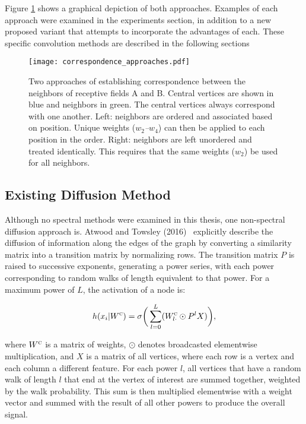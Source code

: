 Figure \ref{fig:correspondence_approaches} shows a graphical depiction of both approaches.
Examples of each approach were examined in the experiments section, in addition to a new proposed variant that attempts to incorporate the advantages of each.
These specific convolution methods are described in the following sections

\begin{figure}
	\centering
	\texttt{[image: correspondence\_approaches.pdf]}
	\caption{Two approaches of establishing correspondence between the neighbors of receptive fields A and B. Central vertices are shown in blue and neighbors in green. The central vertices always correspond with one another. Left: neighbors are ordered and associated based on position. Unique weights (\textit{$w_2$--$w_4$}) can then be applied to each position in the order. Right: neighbors are left unordered and treated identically. This requires that the same weights (\textit{$w_2$}) be used for all neighbors.}
	\label{fig:correspondence_approaches}
\end{figure}


\subsection{Existing Diffusion Method}
Although no spectral methods were examined in this thesis, one non-spectral diffusion approach is.
Atwood and Towsley (2016)~\cite{atwood2016} explicitly describe the diffusion of information along the edges of the graph by converting a similarity matrix into a transition matrix by normalizing rows.
The transition matrix $P$ is raised to successive exponents, generating a power series, with each power corresponding to random walks of length equivalent to that power.
For a maximum power of $L$, the activation of a node is:

\begin{equation}
h(x_i | W^\textsc{c}) = \sigma \bigg( \sum_{l=0}^L (W^\textsc{c}_{l\cdot} \odot P^l X ) \bigg),
\label{eq:diffusion}
\end{equation}

\noindent
where $W^\textsc{c}$ is a matrix of weights, $\odot$ denotes broadcasted elementwise multiplication, and $X$ is a matrix of all vertices, where each row is a vertex and each column a different feature.
For each power $l$, all vertices that have a random walk of length $l$ that end at the vertex of interest are summed together, weighted by the walk probability.
This sum is then multiplied elementwise with a weight vector and summed with the result of all other powers to produce the overall signal.


